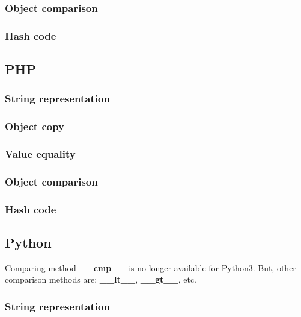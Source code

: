 \documentclass{KodeBook}
\begin{document}
\subsubsection{Object comparison}

\subsubsection{Hash code}

\subsection{PHP}



\subsubsection{String representation}

\subsubsection{Object copy}

\subsubsection{Value equality}

\subsubsection{Object comparison}

\subsubsection{Hash code}

\subsection{Python}



Comparing method \textbf{\_\_cmp\_\_} is no longer available for Python3. 
But, other comparison methods are: \textbf{\_\_lt\_\_}, \textbf{\_\_gt\_\_}, etc.

\subsubsection{String representation}
\end{document}
